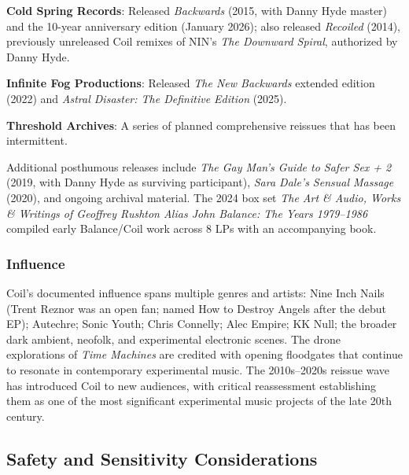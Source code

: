 \documentclass[11pt,letterpaper]{article}
\begin{document}
\textbf{Cold Spring Records}: Released \textit{Backwards} (2015, with Danny Hyde master) and the 10-year anniversary edition (January 2026); also released \textit{Recoiled} (2014), previously unreleased Coil remixes of NIN's \textit{The Downward Spiral}, authorized by Danny Hyde.

\textbf{Infinite Fog Productions}: Released \textit{The New Backwards} extended edition (2022) and \textit{Astral Disaster: The Definitive Edition} (2025).

\textbf{Threshold Archives}: A series of planned comprehensive reissues that has been intermittent.

Additional posthumous releases include \textit{The Gay Man's Guide to Safer Sex + 2} (2019, with Danny Hyde as surviving participant), \textit{Sara Dale's Sensual Massage} (2020), and ongoing archival material. The 2024 box set \textit{The Art \& Audio, Works \& Writings of Geoffrey Rushton Alias John Balance: The Years 1979--1986} compiled early Balance/Coil work across 8 LPs with an accompanying book.

\subsubsection{Influence}

Coil's documented influence spans multiple genres and artists: Nine Inch Nails (Trent Reznor was an open fan; named How to Destroy Angels after the debut EP); Autechre; Sonic Youth; Chris Connelly; Alec Empire; KK Null; the broader dark ambient, neofolk, and experimental electronic scenes. The drone explorations of \textit{Time Machines} are credited with opening floodgates that continue to resonate in contemporary experimental music. The 2010s--2020s reissue wave has introduced Coil to new audiences, with critical reassessment establishing them as one of the most significant experimental music projects of the late 20th century.

\subsection{Safety and Sensitivity Considerations}
\end{document}
